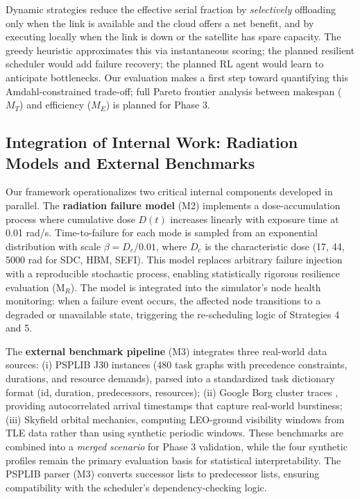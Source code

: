 \documentclass[conference]{IEEEtran}
\begin{document}
Dynamic strategies reduce the effective serial fraction by \textit{selectively} offloading only when the link is available and the cloud offers a net benefit, and by executing locally when the link is down or the satellite has spare capacity. The greedy heuristic approximates this via instantaneous scoring; the planned resilient scheduler would add failure recovery; the planned RL agent would learn to anticipate bottlenecks. Our evaluation makes a first step toward quantifying this Amdahl-constrained trade-off; full Pareto frontier analysis between makespan ($M_T$) and efficiency ($M_E$) is planned for Phase 3.

\subsection{Integration of Internal Work: Radiation Models and External Benchmarks}

Our framework operationalizes two critical internal components developed in parallel. The \textbf{radiation failure model} (M2) implements a dose-accumulation process where cumulative dose $D(t)$ increases linearly with exposure time at 0.01 rad/s. Time-to-failure for each mode is sampled from an exponential distribution with scale $\beta = D_c / 0.01$, where $D_c$ is the characteristic dose (17, 44, 5000 rad for SDC, HBM, SEFI). This model replaces arbitrary failure injection with a reproducible stochastic process, enabling statistically rigorous resilience evaluation (M$_R$). The model is integrated into the simulator's node health monitoring: when a failure event occurs, the affected node transitions to a degraded or unavailable state, triggering the re-scheduling logic of Strategies 4 and 5.

The \textbf{external benchmark pipeline} (M3) integrates three real-world data sources: (i) PSPLIB \cite{psplib} J30 instances (480 task graphs with precedence constraints, durations, and resource demands), parsed into a standardized task dictionary format (id, duration, predecessors, resources); (ii) Google Borg cluster traces \cite{google-traces}, providing autocorrelated arrival timestamps that capture real-world burstiness; (iii) Skyfield \cite{skyfield} orbital mechanics, computing LEO-ground visibility windows from TLE data rather than using synthetic periodic windows. These benchmarks are combined into a \textit{merged scenario} for Phase 3 validation, while the four synthetic profiles remain the primary evaluation basis for statistical interpretability. The PSPLIB parser (M3) converts successor lists to predecessor lists, ensuring compatibility with the scheduler's dependency-checking logic.
\end{document}
